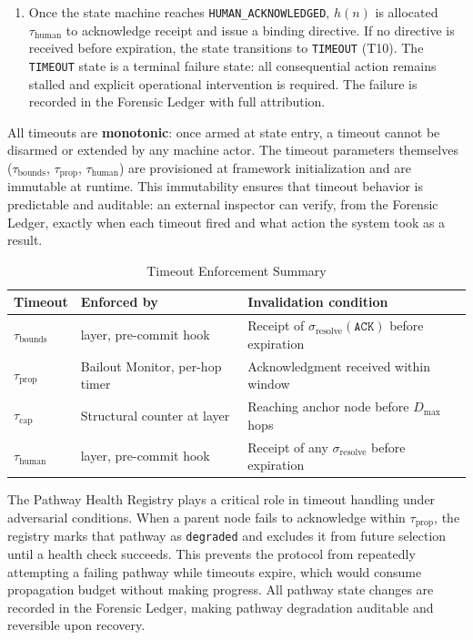 \begin{enumerate}
\item[\textbf{$\tau_{\text{human}}$ --- Human acknowledgment timeout.}] Once the state machine reaches \texttt{HUMAN\_ACKNOWLEDGED}, $h(n)$ is allocated $\tau_{\text{human}}$ to acknowledge receipt and issue a binding directive. If no directive is received before expiration, the state transitions to \texttt{TIMEOUT} (T10). The \texttt{TIMEOUT} state is a terminal failure state: all consequential action remains stalled and explicit operational intervention is required. The failure is recorded in the Forensic Ledger with full attribution.
\end{enumerate}

All timeouts are \textbf{monotonic}: once armed at state entry, a timeout cannot be disarmed or extended by any machine actor. The timeout parameters themselves ($\tau_{\text{bounds}}$, $\tau_{\text{prop}}$, $\tau_{\text{human}}$) are provisioned at framework initialization and are immutable at runtime. This immutability ensures that timeout behavior is predictable and auditable: an external inspector can verify, from the Forensic Ledger, exactly when each timeout fired and what action the system took as a result.

\begin{table}[t]
\caption{Timeout Enforcement Summary}
\label{tab:bp-timeout-enforcement}
\medskip
\noindent\begin{tabular}{lp{3cm}p{5cm}}
\toprule
\textbf{Timeout} & \textbf{Enforced by} & \textbf{Invalidation condition} \\
\midrule
$\tau_{\text{bounds}}$  & \fact{} layer, pre-commit hook & Receipt of $\sigma_{\text{resolve}}(\texttt{ACK})$ before expiration \\
$\tau_{\text{prop}}$   & Bailout Monitor, per-hop timer & Acknowledgment received within window \\
$\tau_{\text{cap}}$    & Structural counter at \fact{} layer & Reaching anchor node before $D_{\max}$ hops \\
$\tau_{\text{human}}$  & \fact{} layer, pre-commit hook & Receipt of any $\sigma_{\text{resolve}}$ before expiration \\
\bottomrule
\end{tabular}
\end{table}

The Pathway Health Registry plays a critical role in timeout handling under adversarial conditions. When a parent node fails to acknowledge within $\tau_{\text{prop}}$, the registry marks that pathway as \texttt{degraded} and excludes it from future selection until a health check succeeds. This prevents the protocol from repeatedly attempting a failing pathway while timeouts expire, which would consume propagation budget without making progress. All pathway state changes are recorded in the Forensic Ledger, making pathway degradation auditable and reversible upon recovery.
